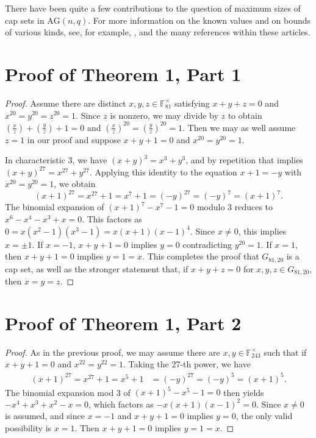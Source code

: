 \documentclass[12pt]{amsart}
\theoremstyle{definition}
\begin{document}
There have been quite a few contributions to the question of maximum
sizes of cap sets in $\text{AG}(n,q)$. For more information on the
known values and on bounds of various kinds, see, for example, \cite{%
  Bennett2019,  Edel2004, EdelFerretLandjevStorme2002,
  EllenbergGijswijt2017, Grochow2019, Hill1974, Hill1976, Hill1983,
  TaitWon2021, Thackeray2021, Thas2020}, and the many references
within these articles.

\section{Proof of Theorem 1, Part 1}

\begin{proof}
Assume there are distinct $x,y,z\in \mathbb{F}_{81}^\times$ satisfying
$x+y+z=0$ and $x^{20}=y^{20}=z^{20}=1$.
Since $z$ is nonzero, we may divide by $z$ to obtain
$\left(\frac{x}{z}\right)+\left(\frac{y}{z}\right)+1=0$ and
$\left(\frac{x}{z}\right)^{20}=\left(\frac{y}{z}\right)^{20}=1$.  Then
we may as well assume $z=1$ in our proof and suppose $x+y+1=0$ and
$x^{20}=y^{20}=1$.

In characteristic 3, we have $(x+y)^3 =x^3+y^3$, and by repetition
that implies $(x+y)^{27}=x^{27}+y^{27}$.  Applying this identity to
the equation $x+1=-y$ with $x^{20}=y^{20}=1$, we obtain
$$
(x+1)^{27}=x^{27}+1=x^7+1=(-y)^{27}=(-y)^7=(x+1)^7.
$$
The binomial expansion of $(x+1)^7-x^7-1=0$ modulo 3 reduces to
$x^6-x^4-x^3+x=0$. This factors as $0=x(x^2-1)(x^3-1)=x(x+1)(x-1)^4$.
Since $x\neq 0$, this implies $x=\pm1$. If $x=-1$, $x+y+1=0$ implies
$y=0$ contradicting $y^{20}=1$.  If $x=1$, then $x+y+1=0$ implies
$y=1=x$.  This completes the proof that $G_{81,20}$ is a cap set, as well as
the stronger statement that, if $x+y+z=0$ for $x,y,z\in G_{81,20}$, then
$x=y=z$. 
\end{proof}

\section{Proof of Theorem 1, Part 2}

\begin{proof}
  As in the previous proof, we may assume there are
  $x,y\in \mathbb{F}_{243}^\times$ such that if $x+y+1=0$ and
  $x^{22}=y^{22}=1$.  Taking the 27-th power, we have
  \begin{align*}
    (x+1)^{27}=x^{27}+1=x^5+1&=(-y)^{27}=(-y)^5=(x+1)^5.
  \end{align*}
  The binomial expansion mod 3 of $(x+1)^5-x^5-1=0$ then yields
  $-x^4+x^3+x^2-x=0$, which factors as $-x(x+1)(x-1)^2=0$. Since
  $x\ne 0$ is assumed, and since $x=-1$ and $x+y+1=0$ implies $y=0$,
  the only valid possibility is $x=1$. Then $x+y+1=0$ implies $y=1=x$. 
\end{proof}
\end{document}
